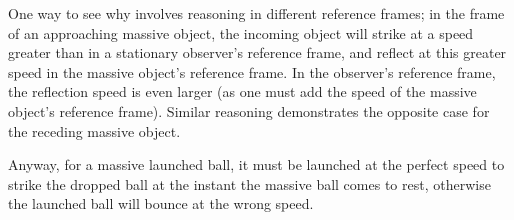 {One way to see why involves reasoning in different reference frames; in the frame of an approaching massive object, the incoming object will strike at a speed greater than in a stationary observer's reference frame, and reflect at this greater speed in the massive object's reference frame. In the observer's reference frame, the reflection speed is even larger (as one must add the speed of the massive object's reference frame). Similar reasoning demonstrates the opposite case for the receding massive object.

Anyway, for a massive launched ball, it must be launched at the perfect speed to strike the dropped ball at the instant the massive ball comes to rest, otherwise the launched ball will bounce at the wrong speed.
}